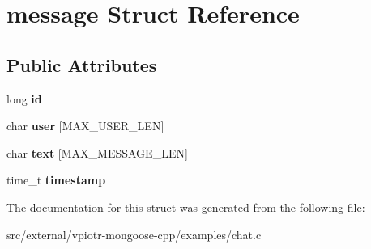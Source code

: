 \hypertarget{structmessage}{\section{message Struct Reference}
\label{structmessage}
}
\subsection*{Public Attributes}
\begin{DoxyCompactItemize}
\item 
\hypertarget{structmessage_aea7f9eaa974b509a72f684651ce34bfd}{long {\bfseries id}}\label{structmessage_aea7f9eaa974b509a72f684651ce34bfd}

\item 
\hypertarget{structmessage_a0d304d226d75ce87d92677eb78bb61f2}{char {\bfseries user} \mbox{[}M\-A\-X\-\_\-\-U\-S\-E\-R\-\_\-\-L\-E\-N\mbox{]}}\label{structmessage_a0d304d226d75ce87d92677eb78bb61f2}

\item 
\hypertarget{structmessage_af8e3a96ce056ca1f2118c7407a0f420a}{char {\bfseries text} \mbox{[}M\-A\-X\-\_\-\-M\-E\-S\-S\-A\-G\-E\-\_\-\-L\-E\-N\mbox{]}}\label{structmessage_af8e3a96ce056ca1f2118c7407a0f420a}

\item 
\hypertarget{structmessage_aa05cfe1f12c674a64792b5be8c2b9124}{time\-\_\-t {\bfseries timestamp}}\label{structmessage_aa05cfe1f12c674a64792b5be8c2b9124}

\end{DoxyCompactItemize}


The documentation for this struct was generated from the following file\-:\begin{DoxyCompactItemize}
\item 
src/external/vpiotr-\/mongoose-\/cpp/examples/chat.\-c\end{DoxyCompactItemize}
